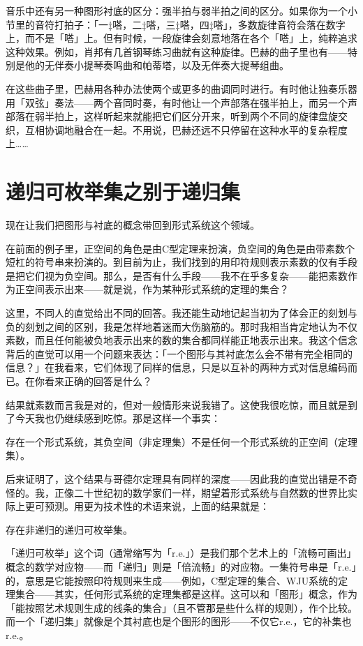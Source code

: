 \documentclass[
  12pt,
  twoside,
  openright,
  oldfontcommands,
]{memoir}
\begin{document}
音乐中还有另一种图形衬底的区分：强半拍与弱半拍之间的区分。如果你为一个小节里的音符打拍子：「一‡嗒，二‡嗒，三‡嗒，四‡嗒」，多数旋律音符会落在数字上，而不是「嗒」上。但有时候，一段旋律会刻意地落在各个「嗒」上，纯粹追求这种效果。例如，肖邦有几首钢琴练习曲就有这种旋律。巴赫的曲子里也有------特别是他的无伴奏小提琴奏鸣曲和帕蒂塔，以及无伴奏大提琴组曲。

在这些曲子里，巴赫用各种办法使两个或更多的曲调同时进行。有时他让独奏乐器用「双弦」奏法------两个音同时奏，有时他让一个声部落在强半拍上，而另一个声部落在弱半拍上，这样听起来就能把它们区分开来，听到两个不同的旋律盘旋交织，互相协调地融合在一起。不用说，巴赫还远不只停留在这种水平的复杂程度上\ldots\ldots{}

\section{递归可枚举集之别于递归集}

现在让我们把图形与衬底的概念带回到形式系统这个领域。

在前面的例子里，正空间的角色是由C型定理来扮演，负空间的角色是由带素数个短杠的符号串来扮演的。到目前为止，我们找到的用印符规则表示素数的仅有手段是把它们视为负空间。那么，是否有什么手段------我不在乎多复杂------能把素数作为正空间表示出来------就是说，作为某种形式系统的定理的集合？

这里，不同人的直觉给出不同的回答。我还能生动地记起当初为了体会正的刻划与负的刻划之间的区别，我是怎样地着迷而大伤脑筋的。那时我相当肯定地认为不仅素数，而且任何能被负地表示出来的数的集合都同样能正地表示出来。我这个信念背后的直觉可以用一个问题来表达：「一个图形与其衬底怎么会不带有完全相同的信息？」在我看来，它们体现了同样的信息，只是以互补的两种方式对信息编码而已。在你看来正确的回答是什么？

结果就素数而言我是对的，但对一般情形来说我错了。这使我很吃惊，而且就是到了今天我也仍继续感到吃惊。那是这样一个事实：

{存在一个形式系统，其负空间（非定理集）不是任何一个形式系统的正空间（定理集）。}

后来证明了，这个结果与哥德尔定理具有同样的深度------因此我的直觉出错是不奇怪的。我，正像二十世纪初的数学家们一样，期望着形式系统与自然数的世界比实际上更可预测。用更为技术性的术语来说，上面的结果就是：

{存在非递归的递归可枚举集。}

「递归可枚举」这个词（通常缩写为「r.e.」）是我们那个艺术上的「流畅可画出」概念的数学对应物------而「递归」则是「倍流畅」的对应物。一集符号串是「r.e.」的，意思是它能按照印符规则来生成------例如，C型定理的集合、WJU系统的定理集合------其实，任何形式系统的定理集都是这样。这可以和「图形」概念，作为「能按照艺术规则生成的线条的集合」（且不管那是些什么样的规则），作个比较。而一个「递归集」就像是个其衬底也是个图形的图形------不仅它r.e.，它的补集也r.e.。
\end{document}
